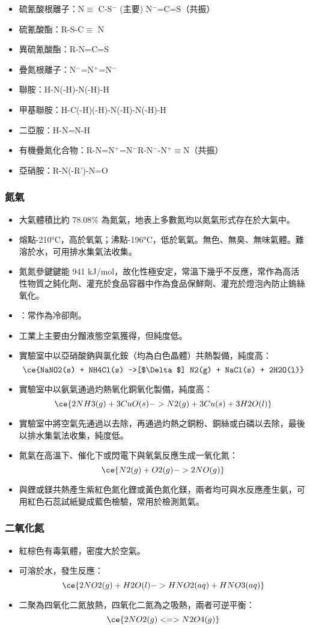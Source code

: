 \documentclass[a4paper,12pt]{report}
\begin{document}
\begin{itemize}
\item 硫氰酸根離子：N$\equiv$ C-S$^-$ (主要) \ce{<=>} N$^-$=C=S（共振）
\item 硫氰酸酯：R-S-C$\equiv$ N
\item 異硫氰酸酯：R-N=C=S
\item 疊氮根離子：N$^-$=N$^+$=N$^-$
\item 聯胺：H-N(-H)-N(-H)-H
\item 甲基聯胺：H-C(-H)(-H)-N(-H)-N(-H)-H
\item 二亞胺：H-N=N-H
\item 有機疊氮化合物：R-N=N$^+$=N$^-$\ce{<=>}R-N$^-$-N$^+\equiv$N（共振）
\item 亞硝胺：R-N(-R')-N=O
\end{itemize}
\subsubsection{氮氣}
\begin{itemize}
\item 大氣體積比約 78.08\% 為氮氣，地表上多數氮均以氮氣形式存在於大氣中。
\item 熔點-210°C，高於氧氣；沸點-196°C，低於氧氣。無色、無臭、無味氣體。難溶於水，可用排水集氣法收集。
\item 氮氮參鍵鍵能 941 kJ/mol，故化性極安定，常溫下幾乎不反應，常作為高活性物質之鈍化劑、灌充於食品容器中作為食品保鮮劑、灌充於燈泡內防止鎢絲氧化。
\item {}：常作為冷卻劑。
\item 工業上主要由分餾液態空氣獲得，但純度低。
\item 實驗室中以亞硝酸鈉與氯化銨（均為白色晶體）共熱製備，純度高：
\[\ce{NaNO2(s) + NH4Cl(s) ->[$\Delta$] N2(g) + NaCl(s) + 2H2O(l)}\]
\item 實驗室中以氨氣通過灼熱氧化銅氧化製備，純度高：
\[\ce{2NH3(g) + 3CuO(s) -> N2(g) + 3Cu(s) + 3H2O(l)}\]
\item 實驗室中將空氣先通過以去除，再通過灼熱之銅粉、銅絲或白磷以去除，最後以排水集氣法收集，純度低。
\item 氮氣在高溫下、催化下或閃電下與氧氣反應生成一氧化氮：
\[\ce{N2(g) + O2(g) -> 2NO(g)}\]
\item 與鋰或鎂共熱產生紫紅色氮化鋰或黃色氮化鎂，兩者均可與水反應產生氨，可用紅色石蕊試紙變成藍色檢驗，常用於檢測氮氣。
\end{itemize}
\subsubsection{二氧化氮}
\begin{itemize}
\item 紅棕色有毒氣體，密度大於空氣。
\item 可溶於水，發生反應：
\[\ce{2NO2(g) + H2O(l) -> HNO2(aq) + HNO3(aq)}\]
\item 二聚為四氧化二氮放熱，四氧化二氮為之吸熱，兩者可逆平衡：
\[\ce{2NO2(g) <=> N2O4(g)}\]
\end{itemize}
\end{document}

